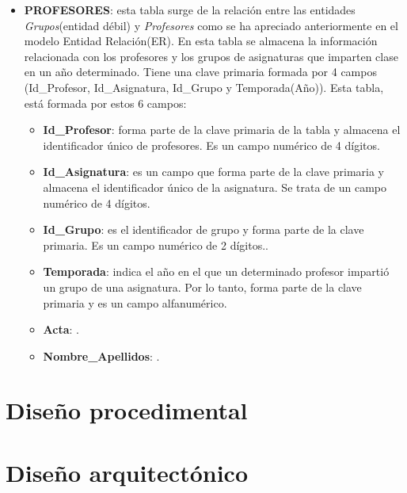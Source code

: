 \begin{itemize}

\newpage


\item
\textbf{PROFESORES}: esta tabla surge de la relación entre las entidades \emph{Grupos}(entidad débil) y \emph{Profesores} como se ha apreciado anteriormente en el modelo Entidad Relación(ER). En esta tabla se almacena la información relacionada con los profesores y los grupos de asignaturas que imparten clase en un año determinado. Tiene una clave primaria formada por 4 campos (Id\_Profesor, Id\_Asignatura, Id\_Grupo y Temporada(Año)). Esta tabla, está formada por estos 6 campos:
\begin{itemize}
\item
\textbf{Id\_Profesor}: forma parte de la clave primaria de la tabla y almacena el identificador único de profesores. Es un campo numérico de 4 dígitos.
\item
\textbf{Id\_Asignatura}: es un campo que forma parte de la clave primaria y almacena el identificador único de la asignatura. Se trata de un campo numérico de 4 dígitos.
\item
\textbf{Id\_Grupo}: es el identificador de grupo y forma parte de la clave primaria. Es un campo numérico de 2 dígitos..
\item
\textbf{Temporada}: indica el año en el que un determinado profesor impartió un grupo de una asignatura. Por lo tanto, forma parte de la clave primaria y es un campo alfanumérico.
\item
\textbf{Acta}: .
\item
\textbf{Nombre\_Apellidos}:   .
\end{itemize}


\newpage

\end{itemize}





\section{Diseño procedimental}

\section{Diseño arquitectónico}



